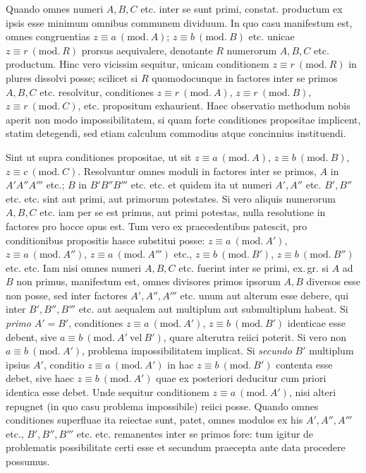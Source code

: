 
Quando omnes numeri $A,B,C$ etc. inter se sunt primi, constat. productum ex ipsis esse
minimum omnibus communem dividuum. In quo casu manifestum est, omnes congruentias
$z\equiv a\ (\mathrm{mod.}\ A)$; $z\equiv b\ (\mathrm{mod.}\ B)$ etc. unicae
$z\equiv r\ (\mathrm{mod.}\ R)$ prorsus aequivalere, denotante $R$ numerorum $A,B,C$ etc.
productum. Hinc vero vicissim sequitur, unicam conditionem $z\equiv r\ (\mathrm{mod.}\ R)$
in plures dissolvi posse; scilicet si $R$ quomodocunque in factores inter se primos
$A,B,C$ etc. resolvitur, conditiones $z\equiv r\ (\mathrm{mod.}\ A)$,
$z\equiv r\ (\mathrm{mod.}\ B)$, $z\equiv r\ (\mathrm{mod.}\ C)$, etc. propositum exhaurient.
Haec observatio methodum nobis aperit
non modo impossibilitatem, si quam forte conditiones propositae implicent, statim
detegendi, sed etiam calculum commodius atque concinnius instituendi.


Sint ut supra conditiones propositae, ut sit $z\equiv a\ (\mathrm{mod.}\ A)$,
$z\equiv b\ (\mathrm{mod.}\ B)$, $z\equiv c\ (\mathrm{mod.}\ C)$. Resolvantur omnes moduli in
factores inter se primos, $A$ in $A'A''A'''$ etc.; $B$ in $B'B''B'''$ etc. etc. et quidem
ita ut numeri $A',A''$ etc. $B',B''$ etc. etc. sint aut primi, aut primorum potestates.
Si vero aliquis numerorum $A,B,C$ etc. iam per se est primus, aut primi potestas, nulla
resolutione in factores pro hocce opus est. Tum vero ex praecedentibus patescit, pro
conditionibus propositis hasce substitui posse: $z\equiv a\ (\mathrm{mod.}\ A')$,
$z\equiv a\ (\mathrm{mod.}\ A'')$, $z\equiv a\ (\mathrm{mod.}\ A''')$ etc.,
$z\equiv b\ (\mathrm{mod.}\ B')$, $z\equiv b\ (\mathrm{mod.}\ B'')$ etc. etc. Iam nisi omnes
numeri $A,B,C$ etc. fuerint inter se primi, ex.\,gr. si $A$ ad $B$ non primus, manifestum
est, omnes divisores primos ipsorum $A,B$ diversos esse non posse, sed inter factores
$A',A'',A'''$ etc. unum aut alterum esse debere, qui inter $B',B'',B'''$ etc. aut aequalem
aut multiplum aut submultiplum habeat. Si \emph{primo} $A'=B'$, conditiones
$z\equiv a\ (\mathrm{mod.}\ A')$, $z\equiv b\ (\mathrm{mod.}\ B')$ identicae esse debent,
sive $a\equiv b\ (\mathrm{mod.}\ A'\ \text{vel}\ B')$, quare alterutra reiici poterit.
Si vero non $a\equiv b\ (\mathrm{mod.}\ A')$, problema impossibilitatem implicat.
Si \emph{secundo} $B'$ multiplum ipsius $A'$, conditio $z\equiv a\ (\mathrm{mod.}\ A')$ in
hac $z\equiv b\ (\mathrm{mod.}\ B')$ contenta esse debet, sive haec
$z\equiv b\ (\mathrm{mod.}\ A')$ quae ex posteriori deducitur cum priori identica esse
debet. Unde sequitur conditionem $z\equiv a\ (\mathrm{mod.}\ A')$, nisi alteri repugnet
(in quo casu problema impossibile) reiici posse. Quando omnes conditiones superfluae
ita reiectae sunt, patet, omnes modulos ex his $A',A'',A'''$ etc., $B',B'',B'''$ etc. etc.
remanentes inter se primos fore: tum igitur de problematis possibilitate certi esse
et secundum praecepta ante data procedere possumus.

